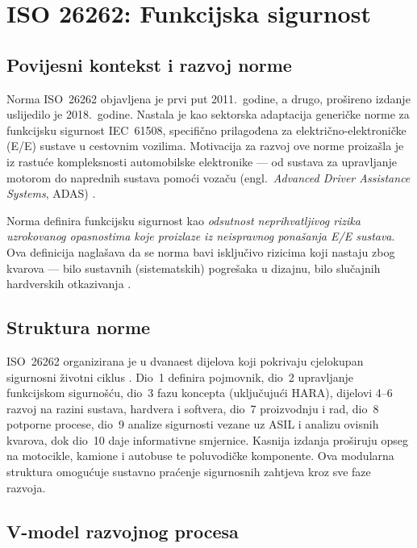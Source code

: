 \section{ISO 26262: Funkcijska sigurnost}
\label{sec:iso26262}

\subsection{Povijesni kontekst i razvoj norme}

Norma ISO~26262 \cite{iso26262} objavljena je prvi put 2011.\ godine, a drugo, prošireno izdanje uslijedilo je 2018.\ godine. Nastala je kao sektorska adaptacija generičke norme za funkcijsku sigurnost IEC~61508, specifično prilagođena za električno-elektroničke (E/E) sustave u cestovnim vozilima. Motivacija za razvoj ove norme proizašla je iz rastuće kompleksnosti automobilske elektronike — od sustava za upravljanje motorom do naprednih sustava pomoći vozaču (engl.\ \textit{Advanced Driver Assistance Systems}, ADAS) \cite{shinde2026reimagining}.

Norma definira funkcijsku sigurnost kao \textit{odsutnost neprihvatljivog rizika uzrokovanog opasnostima koje proizlaze iz neispravnog ponašanja E/E sustava}. Ova definicija naglašava da se norma bavi isključivo rizicima koji nastaju zbog kvarova — bilo sustavnih (sistematskih) pogrešaka u dizajnu, bilo slučajnih hardverskih otkazivanja \cite{iso26262}.

\subsection{Struktura norme}

ISO~26262 organizirana je u dvanaest dijelova koji pokrivaju cjelokupan sigurnosni životni ciklus \cite{iso26262}. Dio~1 definira pojmovnik, dio~2 upravljanje funkcijskom sigurnošću, dio~3 fazu koncepta (uključujući HARA), dijelovi 4--6 razvoj na razini sustava, hardvera i softvera, dio~7 proizvodnju i rad, dio~8 potporne procese, dio~9 analize sigurnosti vezane uz ASIL i analizu ovisnih kvarova, dok dio~10 daje informativne smjernice. Kasnija izdanja proširuju opseg na motocikle, kamione i autobuse te poluvodičke komponente. Ova modularna struktura omogućuje sustavno praćenje sigurnosnih zahtjeva kroz sve faze razvoja.

\subsection{V-model razvojnog procesa}

